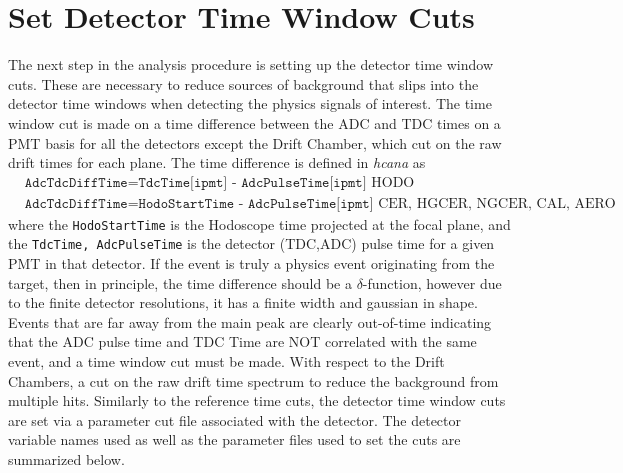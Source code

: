 \documentclass[14pt]{article}
\begin{document}
\section{\textbf{Set Detector Time Window Cuts}}
The next step in the analysis procedure is setting up the detector time window cuts. These are necessary to reduce sources of background that slips into the detector
time windows when detecting the physics signals of interest. The time window cut is made on a time difference between the ADC and TDC times on a PMT basis  for all the detectors
except the Drift Chamber, which cut on the raw drift times for each plane.  The time difference is defined in \textit{hcana} as
\begin{align}
  &\texttt{AdcTdcDiffTime} = \texttt{TdcTime[ipmt] - AdcPulseTime[ipmt]} \text{ HODO} \\
  &\texttt{AdcTdcDiffTime} = \texttt{HodoStartTime - AdcPulseTime[ipmt]} \text{ CER, HGCER, NGCER, CAL, AERO}
\end{align}
where the \texttt{HodoStartTime} is the Hodoscope time projected at the focal plane, and the \texttt{TdcTime, AdcPulseTime} is the detector (TDC,ADC) pulse time for a given PMT in that detector.
If the event is truly a physics event originating from the target, then in principle, the time difference should be a $\delta$-function, however due to the finite
detector resolutions, it has a finite width and gaussian in shape. Events that are far away from the main peak are clearly out-of-time indicating that the ADC pulse time and
TDC Time are NOT correlated with the same event, and a time window cut must be made. With respect to the Drift Chambers, a cut on the raw drift time spectrum to reduce the background
from multiple hits. Similarly to the reference time cuts, the detector time window cuts are set via a parameter cut file associated with the detector.
The detector variable names used as well as the parameter files used to set the cuts are summarized below.
\end{document}
